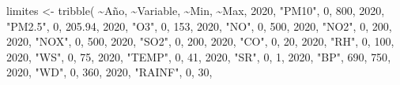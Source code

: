 \documentclass[
  letterpaper,
  DIV=11,
  numbers=noendperiod]{scrartcl}
\newenvironment{Shaded}{\begin{snugshade}}{\end{snugshade}}
\newcommand{\DecValTok}[1]{\textcolor[rgb]{0.68,0.00,0.00}{#1}}
\newcommand{\FloatTok}[1]{\textcolor[rgb]{0.68,0.00,0.00}{#1}}
\newcommand{\FunctionTok}[1]{\textcolor[rgb]{0.28,0.35,0.67}{#1}}
\newcommand{\NormalTok}[1]{\textcolor[rgb]{0.00,0.23,0.31}{#1}}
\newcommand{\OtherTok}[1]{\textcolor[rgb]{0.00,0.23,0.31}{#1}}
\newcommand{\SpecialCharTok}[1]{\textcolor[rgb]{0.37,0.37,0.37}{#1}}
\newcommand{\StringTok}[1]{\textcolor[rgb]{0.13,0.47,0.30}{#1}}
\begin{document}
\begin{Shaded}
\begin{Highlighting}[]
\NormalTok{limites }\OtherTok{\textless{}{-}} \FunctionTok{tribble}\NormalTok{(}
  \SpecialCharTok{\textasciitilde{}}\NormalTok{Año, }\SpecialCharTok{\textasciitilde{}}\NormalTok{Variable, }\SpecialCharTok{\textasciitilde{}}\NormalTok{Min, }\SpecialCharTok{\textasciitilde{}}\NormalTok{Max,}
  \DecValTok{2020}\NormalTok{, }\StringTok{"PM10"}\NormalTok{, }\DecValTok{0}\NormalTok{, }\DecValTok{800}\NormalTok{,}
  \DecValTok{2020}\NormalTok{, }\StringTok{"PM2.5"}\NormalTok{, }\DecValTok{0}\NormalTok{, }\FloatTok{205.94}\NormalTok{,}
  \DecValTok{2020}\NormalTok{, }\StringTok{"O3"}\NormalTok{, }\DecValTok{0}\NormalTok{, }\DecValTok{153}\NormalTok{,}
  \DecValTok{2020}\NormalTok{, }\StringTok{"NO"}\NormalTok{, }\DecValTok{0}\NormalTok{, }\DecValTok{500}\NormalTok{,}
  \DecValTok{2020}\NormalTok{, }\StringTok{"NO2"}\NormalTok{, }\DecValTok{0}\NormalTok{, }\DecValTok{200}\NormalTok{,}
  \DecValTok{2020}\NormalTok{, }\StringTok{"NOX"}\NormalTok{, }\DecValTok{0}\NormalTok{, }\DecValTok{500}\NormalTok{,}
  \DecValTok{2020}\NormalTok{, }\StringTok{"SO2"}\NormalTok{, }\DecValTok{0}\NormalTok{, }\DecValTok{200}\NormalTok{,}
  \DecValTok{2020}\NormalTok{, }\StringTok{"CO"}\NormalTok{, }\DecValTok{0}\NormalTok{, }\DecValTok{20}\NormalTok{,}
  \DecValTok{2020}\NormalTok{, }\StringTok{"RH"}\NormalTok{, }\DecValTok{0}\NormalTok{, }\DecValTok{100}\NormalTok{,}
  \DecValTok{2020}\NormalTok{, }\StringTok{"WS"}\NormalTok{, }\DecValTok{0}\NormalTok{, }\DecValTok{75}\NormalTok{,}
  \DecValTok{2020}\NormalTok{, }\StringTok{"TEMP"}\NormalTok{, }\DecValTok{0}\NormalTok{, }\DecValTok{41}\NormalTok{,}
  \DecValTok{2020}\NormalTok{, }\StringTok{"SR"}\NormalTok{, }\DecValTok{0}\NormalTok{, }\DecValTok{1}\NormalTok{,}
  \DecValTok{2020}\NormalTok{, }\StringTok{"BP"}\NormalTok{, }\DecValTok{690}\NormalTok{, }\DecValTok{750}\NormalTok{,}
  \DecValTok{2020}\NormalTok{, }\StringTok{"WD"}\NormalTok{, }\DecValTok{0}\NormalTok{, }\DecValTok{360}\NormalTok{,}
  \DecValTok{2020}\NormalTok{, }\StringTok{"RAINF"}\NormalTok{, }\DecValTok{0}\NormalTok{, }\DecValTok{30}\NormalTok{,}


\end{Highlighting}
\end{Shaded}
\end{document}
